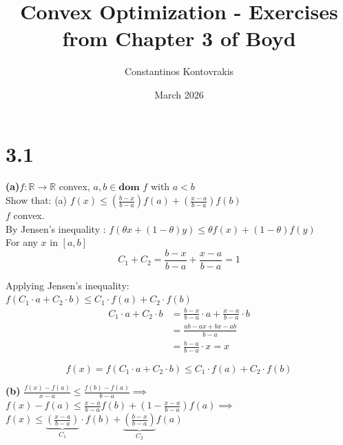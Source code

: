 \documentclass{article}
\title{ Convex Optimization - Exercises from Chapter 3 of Boyd}
\author{Constantinos Kontovrakis}
\date{March 2026}
\begin{document}
\maketitle

\section*{3.1}
\textbf{(a)}\noindent $f: \mathbb{R} \to \mathbb{R}$ convex, $a, b \in \textbf{dom } f$ with $a < b$ \\

\noindent Show that: (a) $f(x) \leq \left( \frac{b-x}{b-a} \right) f(a) + \left( \frac{x-a}{b-a} \right) f(b)$ \\

\noindent $f$ convex. \\
By Jensen's inequality :
$f(\theta x + (1-\theta)y) \leq \theta f(x) + (1-\theta) f(y)$ \\
For any $x$ in $[a, b]$ \\

\[ C_1 + C_2 = \frac{b-x}{b-a} + \frac{x-a}{b-a} = 1 \]

\noindent Applying Jensen's inequality: \\
$f(C_1 \cdot a + C_2 \cdot b) \leq C_1 \cdot f(a) + C_2 \cdot f(b)$ \\

\begin{align*}
C_1 \cdot a + C_2 \cdot b &= \frac{b-x}{b-a} \cdot a + \frac{x-a}{b-a} \cdot b \\
&= \frac{ab - ax + bx - ab}{b-a} \\
&= \frac{b-a}{b-a} \cdot x = x
\end{align*}

\[ f(x) = f(C_1 \cdot a + C_2 \cdot b) \leq C_1 \cdot f(a) + C_2 \cdot f(b) \]












\textbf{(b)} \noindent $\frac{f(x) - f(a)}{x - a} \leq \frac{f(b) - f(a)}{b - a} \implies$ \\

\noindent $f(x) - f(a) \leq \frac{x - a}{b - a} f(b) + \left( 1 - \frac{x - a}{b - a} \right) f(a) \implies$ \\

\noindent $f(x) \leq \underbrace{\left( \frac{x - a}{b - a} \right)}_{C_1} \cdot f(b) + \underbrace{\left( \frac{b - x}{b - a} \right)}_{C_2} f(a)$ \\
\end{document}
